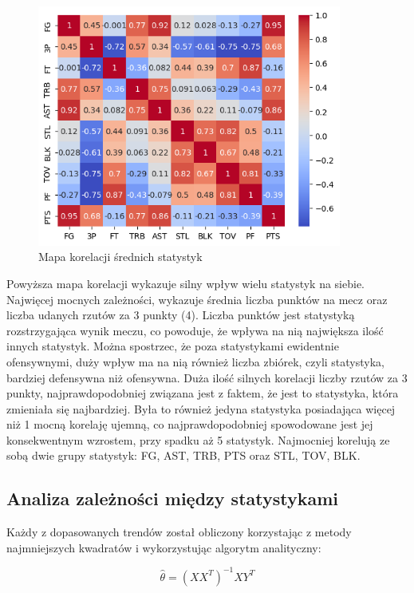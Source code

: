 \documentclass{article}
\begin{document}
        \begin{figure}[H]
            \centering
            \includegraphics[width=10cm]{mapa_korelacji.png}
            \caption{Mapa korelacji średnich statystyk}
            \label{fig:mapa_korelacji}
        \end{figure}
    
    Powyższa mapa korelacji wykazuje silny wpływ wielu statystyk na siebie. Najwięcej mocnych zależności, wykazuje średnia liczba punktów na mecz oraz liczba udanych rzutów za 3 punkty (4). Liczba punktów jest statystyką rozstrzygająca wynik meczu, co powoduje, że wpływa na nią największa ilość innych statystyk. Można spostrzec, że poza statystykami ewidentnie ofensywnymi, duży wpływ ma na nią również liczba zbiórek, czyli statystyka, bardziej defensywna niż ofensywna. Duża ilość silnych korelacji liczby rzutów za 3 punkty, najprawdopodobniej związana jest z faktem, że jest to statystyka, która zmieniała się najbardziej. Była to również jedyna statystyka posiadająca więcej niż 1 mocną korelaję ujemną, co najprawdopodobniej spowodowane jest jej konsekwentnym wzrostem, przy spadku aż 5 statystyk. Najmocniej korelują ze sobą dwie grupy statystyk: FG, AST, TRB, PTS oraz STL, TOV, BLK.
\newpage
    \subsection{Analiza zależności między statystykami}

    Każdy z dopasowanych trendów został obliczony korzystając z metody najmniejszych kwadratów i wykorzystując algorytm analityczny:

    \begin{equation}
    \hat{\theta} = (X X^T)^{-1} X Y^T
    \end{equation}
\end{document}
